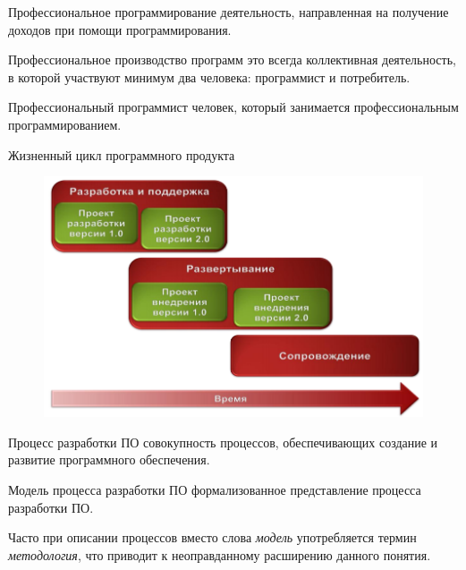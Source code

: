 \documentclass{beamer}
\begin{document}
\begin{frame}[t]
\begin{block}{Профессиональное программирование}
деятельность, направленная на получение доходов при помощи
программирования. 
\end{block}
Профессиональное производство программ это всегда коллективная деятельность, в которой участвуют минимум два человека:
программист и потребитель.
\begin{block}{Профессиональный программист}
человек, который занимается профессиональным программированием. 
\end{block}
\end{frame}

\begin{frame}
Жизненный цикл программного продукта
\begin{figure}[h]
\centering
\includegraphics[scale=0.5]{images/lec01-pic01.png}
\label{pic-sort}
\end{figure}
\end{frame}

\begin{frame}[t]
\begin{block}{Процесс разработки ПО} 
совокупность процессов, обеспечивающих создание и развитие программного обеспечения. 
\end{block}
\begin{block}{Модель процесса разработки ПО}
формализованное представление процесса разработки ПО.
\end{block}
Часто при описании процессов вместо слова \textit{модель} употребляется термин \textit{методология}, что приводит к неоправданному расширению данного понятия. 
\end{frame}
\end{document}
